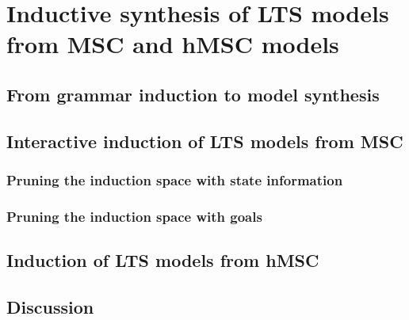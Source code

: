 \chapter{Inductive synthesis of LTS models from MSC and hMSC models\label{chapter:inductive-synthesis}}
  \section{From grammar induction to model synthesis\label{section:inductive-background}}
  \section{Interactive induction of LTS models from MSC}
    \subsection{Pruning the induction space with state information}
    \subsection{Pruning the induction space with goals}
  \section{Induction of LTS models from hMSC}
  \section{Discussion\label{section:inductive-discussion}}
